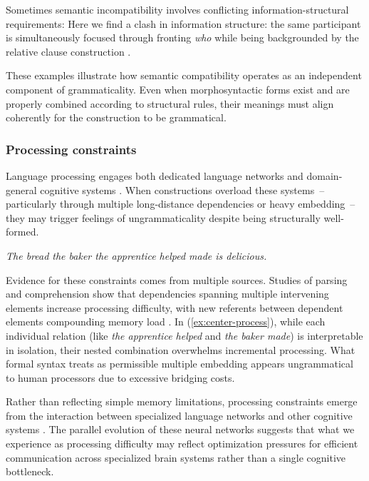 \documentclass[12pt,letterpaper]{article}
\begin{document}
Sometimes semantic incompatibility involves conflicting information-structural requirements:
\z
Here we find a clash in information structure: the same participant is simultaneously focused through fronting \textit{who} while being backgrounded by the relative clause construction \autocite{CuneoGoldberg2023}.

These examples illustrate how semantic compatibility operates as an independent component of grammaticality. Even when morphosyntactic forms exist and are properly combined according to structural rules, their meanings must align coherently for the construction to be grammatical.

\subsubsection{Processing constraints}\label{sec:processing-constraints}

Language processing engages both dedicated language networks and domain-general cognitive systems \autocite{Fedorenko2024}. When constructions overload these systems~-- particularly through multiple long-distance dependencies or heavy embedding~-- they may trigger feelings of ungrammaticality despite being structurally well-formed.

\ea
\textit{The bread the baker the apprentice helped made is delicious.}\label{ex:center-process}
\z

Evidence for these constraints comes from multiple sources. Studies of parsing and comprehension show that dependencies spanning multiple intervening elements increase processing difficulty, with new referents between dependent elements compounding memory load \autocite{gibson2000,Gibson2024}. In (\ref{ex:center-process}), while each individual relation (like \textit{the apprentice helped} and \textit{the baker made}) is interpretable in isolation, their nested combination overwhelms incremental processing. What formal syntax treats as permissible multiple embedding appears ungrammatical to human processors due to excessive bridging costs.

Rather than reflecting simple memory limitations, processing constraints emerge from the interaction between specialized language networks and other cognitive systems \autocite{Fedorenko2024}. The parallel evolution of these neural networks suggests that what we experience as processing difficulty may reflect optimization pressures for efficient communication across specialized brain systems rather than a single cognitive bottleneck.
\end{document}
